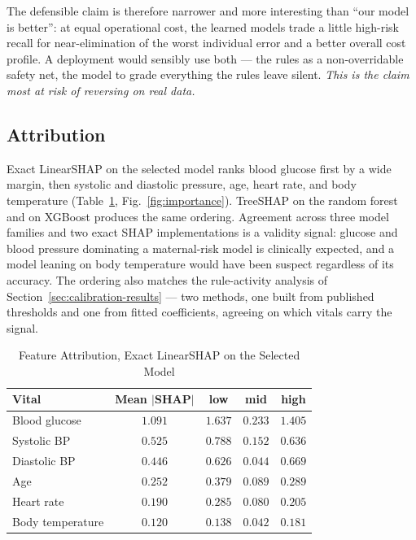 \documentclass[journal]{IEEEtran}
\newcommand{\hdr}[1]{\textbf{#1}}
\begin{document}
The defensible claim is therefore narrower and more interesting than ``our model
is better'': at equal operational cost, the learned models trade a little
high-risk recall for near-elimination of the worst individual error and a better
overall cost profile. A deployment would sensibly use both --- the rules as a
non-overridable safety net, the model to grade everything the rules leave
silent. \emph{This is the claim most at risk of reversing on real data.}

\subsection{Attribution}
\label{sec:attr-results}

Exact LinearSHAP on the selected model ranks blood glucose first by a wide
margin, then systolic and diastolic pressure, age, heart rate, and body
temperature (Table~\ref{tab:shap}, Fig.~\ref{fig:importance}). TreeSHAP on the
random forest and on XGBoost produces the same ordering. Agreement across three
model families and two exact SHAP implementations is a validity signal: glucose
and blood pressure dominating a maternal-risk model is clinically expected, and
a model leaning on body temperature would have been suspect regardless of its
accuracy. The ordering also matches the rule-activity analysis of
Section~\ref{sec:calibration-results} --- two methods, one built from published
thresholds and one from fitted coefficients, agreeing on which vitals carry the
signal.

\begin{table}[!t]
\renewcommand{\arraystretch}{1.3}
\caption{Feature Attribution, Exact LinearSHAP on the Selected Model}
\label{tab:shap}
\centering
\footnotesize
\begin{tabular}{@{}lcccc@{}}
\toprule
\hdr{Vital} & \hdr{Mean $|$SHAP$|$} & \hdr{low} & \hdr{mid} & \hdr{high} \\
\midrule
Blood glucose    & $\mathbf{1.091}$ & $1.637$ & $0.233$ & $1.405$ \\
Systolic BP      & $0.525$ & $0.788$ & $0.152$ & $0.636$ \\
Diastolic BP     & $0.446$ & $0.626$ & $0.044$ & $0.669$ \\
Age              & $0.252$ & $0.379$ & $0.089$ & $0.289$ \\
Heart rate       & $0.190$ & $0.285$ & $0.080$ & $0.205$ \\
Body temperature & $0.120$ & $0.138$ & $0.042$ & $0.181$ \\
\bottomrule
\end{tabular}
\end{table}
\end{document}
